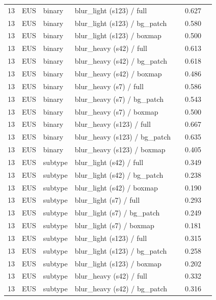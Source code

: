 \begin{longtable}{cL{1.1cm}L{1.5cm}L{5.6cm}ccc}
13 & EUS & binary & blur\_light (s123) / full & \nl{} & 0.627 & \nl{} \\
13 & EUS & binary & blur\_light (s123) / bg\_patch & \nl{} & 0.580 & \nl{} \\
13 & EUS & binary & blur\_light (s123) / boxmap & \nl{} & 0.500 & \nl{} \\
13 & EUS & binary & blur\_heavy (s42) / full & \nl{} & 0.613 & \nl{} \\
13 & EUS & binary & blur\_heavy (s42) / bg\_patch & \nl{} & 0.618 & \nl{} \\
13 & EUS & binary & blur\_heavy (s42) / boxmap & \nl{} & 0.486 & \nl{} \\
13 & EUS & binary & blur\_heavy (s7) / full & \nl{} & 0.586 & \nl{} \\
13 & EUS & binary & blur\_heavy (s7) / bg\_patch & \nl{} & 0.543 & \nl{} \\
13 & EUS & binary & blur\_heavy (s7) / boxmap & \nl{} & 0.500 & \nl{} \\
13 & EUS & binary & blur\_heavy (s123) / full & \nl{} & 0.667 & \nl{} \\
13 & EUS & binary & blur\_heavy (s123) / bg\_patch & \nl{} & 0.635 & \nl{} \\
13 & EUS & binary & blur\_heavy (s123) / boxmap & \nl{} & 0.405 & \nl{} \\
13 & EUS & subtype & blur\_light (s42) / full & \nl{} & 0.349 & \nl{} \\
13 & EUS & subtype & blur\_light (s42) / bg\_patch & \nl{} & 0.238 & \nl{} \\
13 & EUS & subtype & blur\_light (s42) / boxmap & \nl{} & 0.190 & \nl{} \\
13 & EUS & subtype & blur\_light (s7) / full & \nl{} & 0.293 & \nl{} \\
13 & EUS & subtype & blur\_light (s7) / bg\_patch & \nl{} & 0.249 & \nl{} \\
13 & EUS & subtype & blur\_light (s7) / boxmap & \nl{} & 0.181 & \nl{} \\
13 & EUS & subtype & blur\_light (s123) / full & \nl{} & 0.315 & \nl{} \\
13 & EUS & subtype & blur\_light (s123) / bg\_patch & \nl{} & 0.258 & \nl{} \\
13 & EUS & subtype & blur\_light (s123) / boxmap & \nl{} & 0.202 & \nl{} \\
13 & EUS & subtype & blur\_heavy (s42) / full & \nl{} & 0.332 & \nl{} \\
13 & EUS & subtype & blur\_heavy (s42) / bg\_patch & \nl{} & 0.316 & \nl{} \\

\end{longtable}
